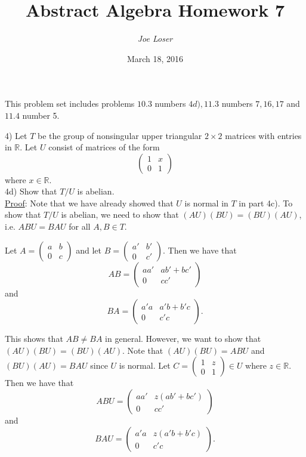 \documentclass{article}
\title{Abstract Algebra Homework 7}
\author{\textit{Joe Loser}}
\date{March 18, 2016}
\begin{document}
\maketitle

This problem set includes problems $10.3$ numbers $4d), 11.3$ numbers $7, 16,17$ and $11.4$ number 5.

4) Let $T$ be the group of nonsingular upper triangular $2 \times 2$ matrices with entries in $\mathbb{R}$. Let $U$ consist of matrices of the form 
$$\begin{pmatrix}
1 & x \\
0 & 1
\end{pmatrix}$$
where $x \in \mathbb{R}$. \\

4d) Show that $T/U$ is abelian. \\

\underline{Proof}: Note that we have already showed that $U$ is normal in $T$ in part 4c). To show that $T/U$ is abelian, we need to show that $(AU)(BU) = (BU)(AU)$, i.e. $ABU = BAU$ for all $A, B \in T$.

Let $A =
\begin{pmatrix}
	a & b \\ 
	0 & c
\end{pmatrix}$ and let $B =
\begin{pmatrix}
	a' & b' \\
	0 & c'
\end{pmatrix}$. Then we have that $$AB = 
\begin{pmatrix}
	aa' & ab' + bc' \\
	0 & cc'
\end{pmatrix}$$ and $$BA = 
\begin{pmatrix}
	a'a & a'b + b'c \\
	0 & c'c
\end{pmatrix}.$$ 

This shows that $AB \neq BA$ in general. However, we want to show that $(AU)(BU) = (BU)(AU)$. Note that $(AU)(BU) = ABU$ and $(BU)(AU) = BAU$ since $U$ is normal. Let $C =
\begin{pmatrix}
	1 & z \\
	0 & 1
\end{pmatrix} \in U$ where $z \in \mathbb{R}$. Then we have that
$$ABU =
\begin{pmatrix}
	aa' & z(ab' + bc') \\
	0 & cc'
\end{pmatrix}$$ and 
$$BAU = 
\begin{pmatrix}
a'a & z(a'b + b'c) \\
0 & c'c
\end{pmatrix}.$$ 
\end{document}
